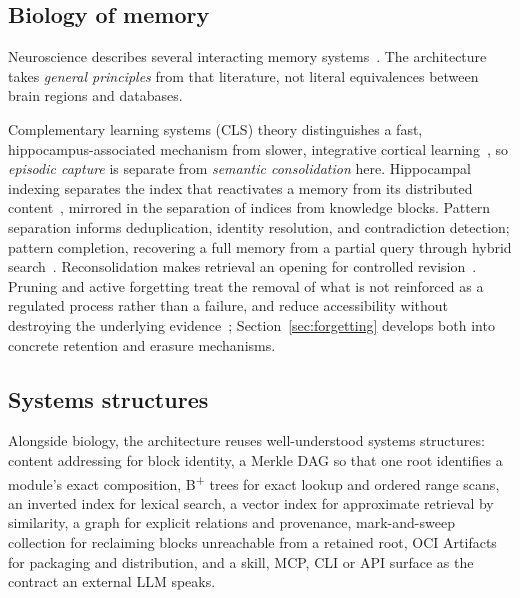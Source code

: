 \documentclass[11pt,a4paper]{article}
\begin{document}
\subsection{Biology of memory}

Neuroscience describes several interacting memory
systems~\cite{kumaran2016cls, goode2018engram, yassa2011pattern,
knierim2016tracking, rebola2017pattern, nader2009reconsolidation,
redondo2011tagging, ryan2022forgetting}. The architecture takes \emph{general
principles} from that literature, not literal equivalences between brain
regions and databases.

Complementary learning systems (CLS) theory distinguishes a fast,
hippocampus-associated mechanism from slower, integrative cortical
learning~\cite{kumaran2016cls}, so \emph{episodic capture} is separate from
\emph{semantic consolidation} here. Hippocampal indexing separates the index
that reactivates a memory from its distributed
content~\cite{goode2018engram}, mirrored in the separation of indices from
knowledge blocks. Pattern separation informs deduplication, identity
resolution, and contradiction detection; pattern completion, recovering a full
memory from a partial query through hybrid search~\cite{yassa2011pattern,
knierim2016tracking, rebola2017pattern}. Reconsolidation makes retrieval an
opening for controlled revision~\cite{nader2009reconsolidation,
redondo2011tagging}. Pruning and active forgetting treat the removal of what is
not reinforced as a regulated process rather than a failure, and reduce
accessibility without destroying the underlying
evidence~\cite{paolicelli2011pruning, davis2017forgetting, ryan2022forgetting};
Section~\ref{sec:forgetting} develops both into concrete retention and erasure
mechanisms.

\subsection{Systems structures}

Alongside biology, the architecture reuses well-understood systems structures:
content addressing for block identity, a Merkle DAG so that one root
identifies a module's exact composition, B\textsuperscript{+} trees for exact
lookup and ordered range scans, an inverted index for lexical search, a vector
index for approximate retrieval by similarity, a graph for explicit relations
and provenance, mark-and-sweep collection for reclaiming blocks unreachable
from a retained root, OCI Artifacts for packaging and distribution, and a
skill, MCP, CLI or API surface as the contract an external LLM speaks.
\end{document}

